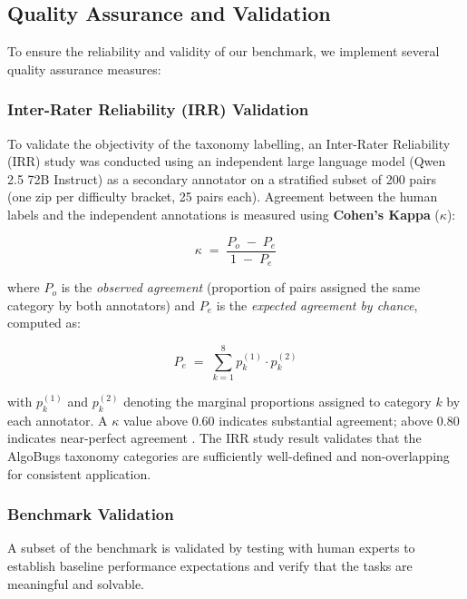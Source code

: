 \subsection{Quality Assurance and Validation}

To ensure the reliability and validity of our benchmark, we implement several quality assurance measures:

\subsubsection{Inter-Rater Reliability (IRR) Validation}

To validate the objectivity of the taxonomy labelling, an Inter-Rater Reliability (IRR) study was conducted using an independent large language model (Qwen 2.5 72B Instruct) as a secondary annotator on a stratified subset of 200 pairs (one zip per difficulty bracket, 25 pairs each). Agreement between the human labels and the independent annotations is measured using \textbf{Cohen's Kappa} ($\kappa$):

\begin{equation}
\kappa \;=\; \frac{P_o \;-\; P_e}{1 \;-\; P_e}
\label{eq:kappa}
\end{equation}

where $P_o$ is the \textit{observed agreement} (proportion of pairs assigned the same category by both annotators) and $P_e$ is the \textit{expected agreement by chance}, computed as:

\begin{equation}
P_e \;=\; \sum_{k=1}^{8} p_{k}^{(1)} \cdot p_{k}^{(2)}
\label{eq:pe}
\end{equation}

with $p_{k}^{(1)}$ and $p_{k}^{(2)}$ denoting the marginal proportions assigned to category $k$ by each annotator. A $\kappa$ value above 0.60 indicates substantial agreement; above 0.80 indicates near-perfect agreement \cite{just2014defects4j}. The IRR study result validates that the AlgoBugs taxonomy categories are sufficiently well-defined and non-overlapping for consistent application.

\subsubsection{Benchmark Validation}

A subset of the benchmark is validated by testing with human experts to establish baseline performance expectations and verify that the tasks are meaningful and solvable.

